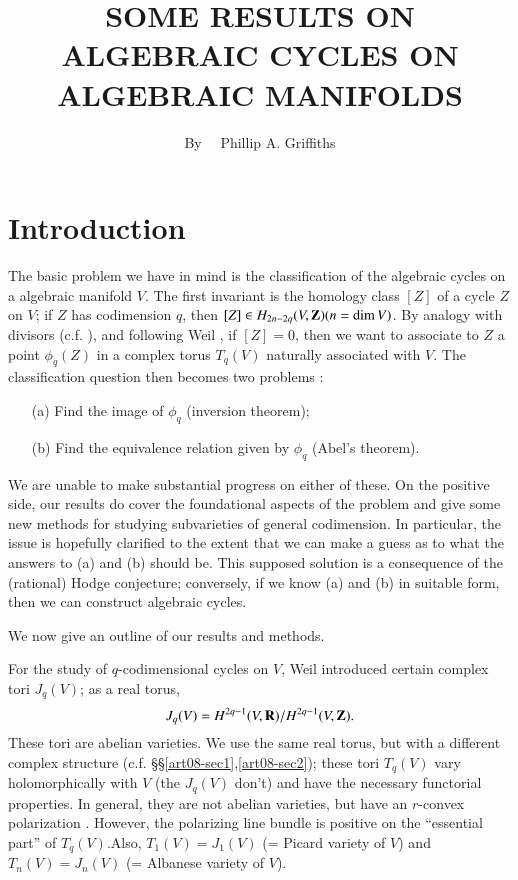 \title{SOME RESULTS ON ALGEBRAIC CYCLES ON ALGEBRAIC MANIFOLDS}

\author{By~~ Phillip A. Griffiths}

\date{}

\maketitle

\setcounter{pageoriginal}{92}
\setcounter{section}{-1}
\section{Introduction}\label{art08-sec0}\pageoriginale

The basic problem we have in mind is the classification of the algebraic cycles on a algebraic manifold $V$. The first invariant is the homology class $[Z]$ of a cycle $Z$ on $V$; if $Z$ has codimension $q$, then $[Z]\in H_{2n-2q}(V,\mathbf{Z})(n=\dim V)$. By analogy with divisors (c.f. \cite{art08-key18}), and following Weil \cite{art08-key22}, if $[Z]=0$, then we want to associate to $Z$ a point $\phi_{q}(Z)$ in a complex torus $T_{q}(V)$ naturally associated with $V$. The classification question then becomes two problems :
\begin{itemize}
\item[(a)] Find the image of $\phi_{q}$ (inversion theorem);

\item[(b)] Find the equivalence relation given by $\phi_{q}$ (Abel's theorem).
\end{itemize}

We are unable to make substantial progress on either of these. On the positive side, our results do cover the foundational aspects of the problem and give some new methods for studying subvarieties of general codimension. In particular, the issue is hopefully clarified to the extent that we can make a guess as to what the answers to (a) and (b) should be. This supposed solution is a consequence of the (rational) Hodge conjecture; conversely, if we know (a) and (b) in suitable form, then we can construct algebraic cycles.

We now give an outline of our results and methods.

For the study of $q$-codimensional cycles on $V$, Weil introduced certain complex tori $J_{q}(V)$; as a real torus,
$$
J_{q}(V)=H^{2q-1}(V,\mathbf{R})/H^{2q-1}(V,\mathbf{Z}).
$$
These tori are abelian varieties. We use the same real torus, but with a different complex structure (c.f. \S\S\ref{art08-sec1},\ref{art08-sec2}); these tori $T_{q}(V)$ vary holomorphically with $V$ (the $J_{q}(V)$ don't) and have the necessary functorial properties. In general, they are not abelian varieties, but have an $r$-convex polarization \cite{art08-key9}. However, the polarizing line bundle is positive on the ``essential part'' of $T_{q}(V)$.\pageoriginale Also, $T_{1}(V)=J_{1}(V)$ (= Picard variety of $V$) and $T_{n}(V)=J_{n}(V)$ (= Albanese variety of $V$).

